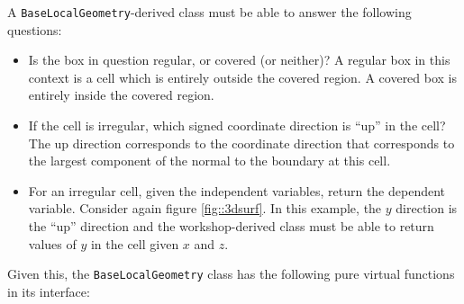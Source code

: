 A {\tt BaseLocalGeometry}-derived 
class must be able to answer the following questions:
\begin{itemize}
\item Is the box in question regular, or covered (or neither)?
      A regular box in this context is a cell which is 
      entirely outside the covered region.  A covered box
      is entirely inside the covered region.
\item If the cell is irregular, which signed coordinate direction is
        ``up'' in the cell?   
     The up direction corresponds to the coordinate
      direction that corresponds to the largest component of the
      normal to the boundary at this cell.
\item For an irregular cell, given the independent variables,
      return the  dependent variable.  Consider again figure
      \ref{fig::3dsurf}.  In this example, the $y$ direction
      is the ``up'' direction and the workshop-derived class 
      must be able to return values of $y$ in the cell given
      $x$ and $z$.
\end{itemize}
Given this, the {\tt BaseLocalGeometry} class has the following
pure virtual functions in its interface:
